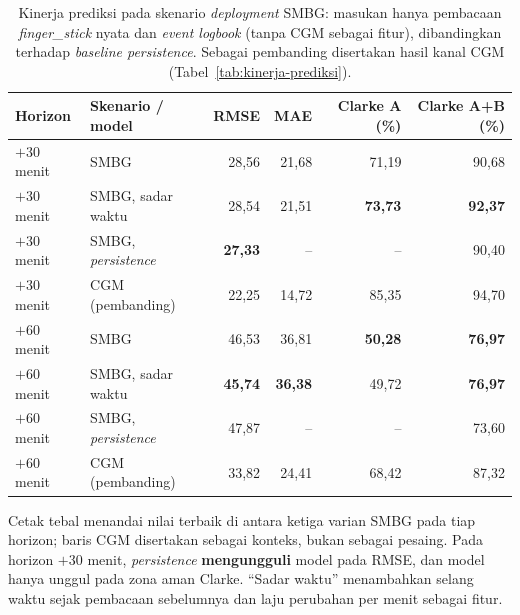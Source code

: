 \begin{table}[htbp]
\centering
\caption{Kinerja prediksi pada skenario \emph{deployment} SMBG: masukan hanya pembacaan \emph{finger\_stick} nyata dan \emph{event logbook} (tanpa CGM sebagai fitur), dibandingkan terhadap \emph{baseline persistence}. Sebagai pembanding disertakan hasil kanal CGM (Tabel~\ref{tab:kinerja-prediksi}).}
\label{tab:smbg-deployment}
\small
\begin{tabular}{@{}llrrrr@{}}
\toprule
\textbf{Horizon} & \textbf{Skenario / model} & \textbf{RMSE} & \textbf{MAE} & \textbf{Clarke A (\%)} & \textbf{Clarke A+B (\%)} \\
\midrule
$+30$ menit & SMBG & 28,56 & 21,68 & 71,19 & 90,68 \\
$+30$ menit & SMBG, sadar waktu & 28,54 & 21,51 & \textbf{73,73} & \textbf{92,37} \\
$+30$ menit & SMBG, \emph{persistence} & \textbf{27,33} & -- & -- & 90,40 \\
$+30$ menit & CGM (pembanding) & 22,25 & 14,72 & 85,35 & 94,70 \\
\midrule
$+60$ menit & SMBG & 46,53 & 36,81 & \textbf{50,28} & \textbf{76,97} \\
$+60$ menit & SMBG, sadar waktu & \textbf{45,74} & \textbf{36,38} & 49,72 & \textbf{76,97} \\
$+60$ menit & SMBG, \emph{persistence} & 47,87 & -- & -- & 73,60 \\
$+60$ menit & CGM (pembanding) & 33,82 & 24,41 & 68,42 & 87,32 \\
\bottomrule
\end{tabular}

\vspace{0.4em}
{\footnotesize Cetak tebal menandai nilai terbaik di antara ketiga varian SMBG pada tiap horizon; baris CGM disertakan sebagai konteks, bukan sebagai pesaing. Pada horizon $+30$ menit, \emph{persistence} \textbf{mengungguli} model pada RMSE, dan model hanya unggul pada zona aman Clarke. ``Sadar waktu'' menambahkan selang waktu sejak pembacaan sebelumnya dan laju perubahan per menit sebagai fitur.}
\end{table}
